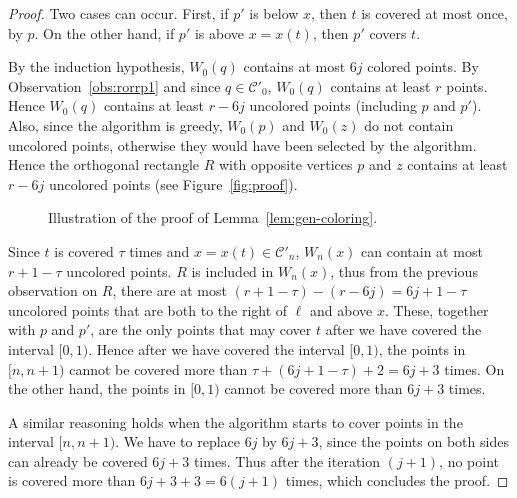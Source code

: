 \documentclass[english,11pt]{article}
\newcommand{\bigc}{\mathcal C}
\begin{document}
\begin{proof}
Two cases can occur. First, if $p'$ is below $x$, then $t$ is covered at most once, by $p$.
On the other hand, if $p'$ is above $x=x(t)$, then $p'$ covers $t$. 

By the  induction hypothesis,  $W_0 (q)$ contains at most $6j$ colored points. By Observation~\ref{obs:rorrp1} and since $q\in\bigc'_0$,  $W_0 (q)$ contains at least $r$ points. Hence $W_0 (q)$ contains at least $r{-}6j$ uncolored points (including $p$ and $p'$). Also, since the algorithm is greedy, $W_0 (p)$ and $W_0(z)$ do not contain  uncolored points, otherwise they would have been selected by the algorithm. Hence the orthogonal rectangle $R$ with opposite vertices $p$ and $z$  contains at least $r{-}6j$ uncolored points (see Figure~\ref{fig:proof}).

\begin{figure}[htb]
\begin{center}
\subfigure[\label{fig:twointervals}The point $p$ is associated with two intervals $I_1(p)\subseteq [0,1)$, and $I_2(p)\subseteq [n,n{+}1)$.]{\texttt{[image: twointervals.pdf]}}
\hspace{1.5cm}
\end{center}
\caption{Illustration of the proof of Lemma~\ref{lem:gen-coloring}.}
\end{figure}

Since $t$ is covered $\tau$ times and $x=x(t)\in\bigc'_n$,  $W_n (x)$ can contain at most $r{+}1{-}\tau$ uncolored points. $R$ is included in $W_n(x)$, thus from the previous observation on $R$, there are at most $(r {+} 1 {-} \tau) {-} (r {-} 6j) = 6j {+} 1 {-} \tau$ uncolored points that are both to the right of $\ell$ and above $x$. These, together with $p$ and $p'$, are the only points that may cover $t$ after we have covered the interval $[0,1)$. Hence after we have covered the interval $[0,1)$, the points in $[n,n{+}1)$ cannot be covered more than $\tau {+} (6j {+} 1 {-} \tau) {+} 2 = 6j {+} 3$ times. On the other hand, the points in $[0,1)$ cannot be covered more than $6j{+}3$ times.

A similar reasoning holds when the algorithm starts to cover points in the interval $[n,n{+}1)$. We have to replace $6j$ by $6j{+}3$, since the points on both sides can already be covered $6j{+}3$ times. Thus after the  iteration $(j{{+}}1)$, no point is covered more than $6j{+}3{+}3 = 6(j{{+}}1)$ times, which concludes the proof.
\end{proof}
\end{document}
